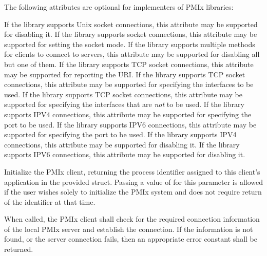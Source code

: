\optattrstart
The following attributes are optional for implementers of \ac{PMIx} libraries:

 If the library supports Unix socket connections, this attribute may be supported for disabling it.
\pasteAttributeItemEnd{}
 If the library supports socket connections, this attribute may be supported for setting the socket mode.
\pasteAttributeItemEnd{}
 If the library supports multiple methods for clients to connect to servers, this attribute may be supported for disabling all but one of them.
\pasteAttributeItemEnd{}
 If the library supports TCP socket connections, this attribute may be supported for reporting the URI.
\pasteAttributeItemEnd{}
 If the library supports TCP socket connections, this attribute may be supported for specifying the interfaces to be used.
\pasteAttributeItemEnd{}
 If the library supports TCP socket connections, this attribute may be supported for specifying the interfaces that are \textit{not} to be used.
\pasteAttributeItemEnd{}
 If the library supports IPV4 connections, this attribute may be supported for specifying the port to be used.
\pasteAttributeItemEnd{}
 If the library supports IPV6 connections, this attribute may be supported for specifying the port to be used.
\pasteAttributeItemEnd{}
 If the library supports IPV4 connections, this attribute may be supported for disabling it.
\pasteAttributeItemEnd{}
 If the library supports IPV6 connections, this attribute may be supported for disabling it.
\pasteAttributeItemEnd{}
\optattrend

\descr

Initialize the \ac{PMIx} client, returning the process identifier assigned to this client's application in the provided  struct.
Passing a value of  for this parameter is allowed if the user wishes solely to initialize the \ac{PMIx} system and does not require return of the identifier at that time.

When called, the \ac{PMIx} client shall check for the required connection information of the local \ac{PMIx} server and establish the connection.
If the information is not found, or the server connection fails, then an appropriate error constant shall be returned.

